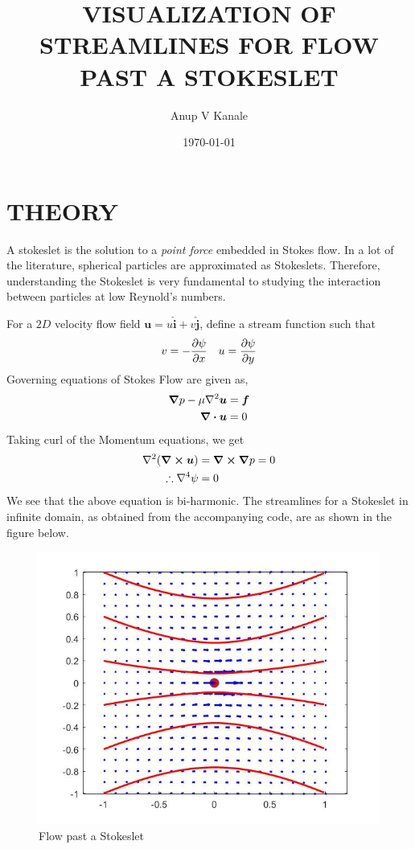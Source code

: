 \documentclass[11pt, oneside]{article}   	%
\title{\vspace{-6ex}\Large VISUALIZATION OF STREAMLINES FOR FLOW PAST A STOKESLET}
\author{\vspace{-6ex}Anup V Kanale}
\date{\vspace{-3ex}\today}							%
\begin{document}
\maketitle
\section*{\vspace{-2ex} THEORY}
A stokeslet is the solution to a \textit{point force} embedded in Stokes flow. In a lot of the literature, spherical particles are approximated as Stokeslets. Therefore, understanding the Stokeslet is very fundamental to studying the interaction between particles at low Reynold's numbers.

For a $2D$ velocity flow field $\boldsymbol{u} = u\boldsymbol{\hat{i}} + v \boldsymbol{\hat{j}} $, define a stream function such that
	\begin{equation}
	v = -\pdv{\psi}{x} \quad  u = \pdv{\psi}{y}
	\end{equation}
Governing equations of Stokes Flow are given as,
	\begin{align}
 	\grad p - \mu \laplacian \boldsymbol{u} &= \boldsymbol{f} \\
 	\div \boldsymbol{u} &= 0
	\end{align}
Taking curl of the Momentum equations, we get
	\begin{align}
	\laplacian (\curl \boldsymbol{u}) &= \curl \grad p = 0 \\
	\therefore \nabla^4 \psi &= 0
	\end{align}
We see that the above equation is bi-harmonic. The streamlines for a Stokeslet in infinite domain, as obtained from the accompanying code, are as shown in the figure below.
	\begin{figure} [!htbp]
	\centering
	\includegraphics[scale=0.4]{StokesletStreamlines_picture}
	\caption{Flow past a Stokeslet}
	\end{figure}
\end{document}
